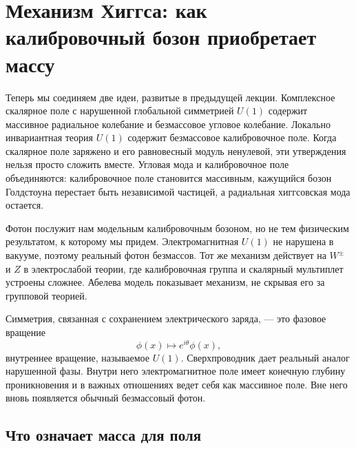 \chapter{Механизм Хиггса: как калибровочный бозон приобретает массу}

Теперь мы соединяем две идеи, развитые в предыдущей лекции. Комплексное скалярное поле с нарушенной глобальной симметрией \(U(1)\) содержит массивное радиальное колебание и безмассовое угловое колебание. Локально инвариантная теория \(U(1)\) содержит безмассовое калибровочное поле. Когда скалярное поле заряжено и его равновесный модуль ненулевой, эти утверждения нельзя просто сложить вместе. Угловая мода и калибровочное поле объединяются: калибровочное поле становится массивным, кажущийся бозон Голдстоуна перестает быть независимой частицей, а радиальная хиггсовская мода остается.

Фотон послужит нам модельным калибровочным бозоном, но не тем физическим результатом, к которому мы придем. Электромагнитная \(U(1)\) не нарушена в вакууме, поэтому реальный фотон безмассов. Тот же механизм действует на \(W^\pm\) и \(Z\) в электрослабой теории, где калибровочная группа и скалярный мультиплет устроены сложнее. Абелева модель показывает механизм, не скрывая его за групповой теорией.

\begin{classroomqa}\end{classroomqa}

Симметрия, связанная с сохранением электрического заряда, — это фазовое вращение \begin{equation}
  \phi(x)\longmapsto e^{i\theta}\phi(x),
\end{equation} внутреннее вращение, называемое \(U(1)\). Сверхпроводник дает реальный аналог нарушенной фазы. Внутри него электромагнитное поле имеет конечную глубину проникновения и в важных отношениях ведет себя как массивное поле. Вне него вновь появляется обычный безмассовый фотон.

\section{Что означает масса для поля}

